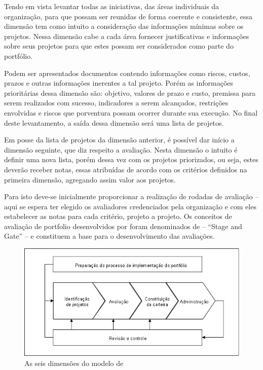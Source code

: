 \documentclass[12pt,a4paper,ruledheader,tocpage=prefix,floatnumber=continuous,pagestart=folhaderosto,font=times]{abnt}
\begin{document}
Tendo em vista levantar todas as iniciativas, das áreas individuais da organização, para que possam ser reunidas de forma coerente e consistente, essa 
dimensão tem como intuito a consideração das informações mínimas sobre os projetos. Nessa dimensão cabe a cada área fornecer justificativas e informações
sobre seus projetos para que estes possam ser considerados como parte do portfólio. 

Podem ser apresentados documentos contendo informações como riscos, custos, prazos e outras informações inerentes a tal projeto. Porém as informações 
prioritárias dessa dimensão são: objetivo, valores de prazo e custo, premissa para serem realizados com sucesso, indicadores a serem alcançados, 
restrições envolvidas e riscos que porventura possam ocorrer durante sua execução. No final deste levantamento, a saída dessa dimensão será uma lista de 
projetos.

Em posse da lista de projetos da dimensão anterior, é possível dar início a dimensão seguinte, que diz respeito a avaliação. Nesta dimensão o intuito é 
definir uma nova lista, porém dessa vez com os projetos priorizados, ou seja, estes deverão receber notas, essas atribuídas de acordo com os critérios 
definidos na primeira dimensão, agregando assim valor aos projetos. 

Para isto deve-se inicialmente proporcionar a realização de rodadas de avaliação – aqui se espera ter elegido os avaliadores credenciados pela organização 
e com eles estabelecer as notas para cada critério, projeto a projeto. Os conceitos de avaliação de portfolio desenvolvidos por \cite{cooper} foram 
denominados de – ``Stage and Gate'' – e constituem a base para o desenvolvimento das avaliações.


\begin{figure}[H]
\centering
\includegraphics[width=.9\textwidth]{rabechini.jpg}
\caption{As seis dimensões do modelo de \cite{rabechini}}
\label{fig:exampleFig1}
\end{figure}
\end{document}
